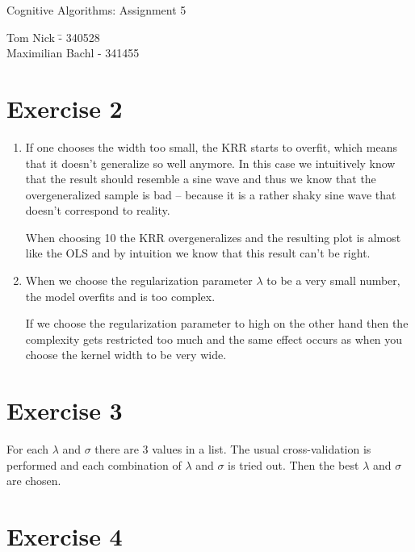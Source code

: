 \documentclass[a4paper,10pt]{article}
\begin{document}
\begin{center}
\Large{Cognitive Algorithms: Assignment 5} \\
\end{center}
\begin{tabbing}
Tom Nick \hspace{2cm}\= - 340528\\
Maximilian Bachl \> - 341455 \\
\end{tabbing}

\section*{Exercise 2}

\begin{enumerate}

\item
If one chooses the width too small, the KRR starts to overfit, which means that it doesn't generalize so well anymore. In this case we intuitively know that the result should resemble a sine wave and thus we know that the overgeneralized sample is bad -- because it is a rather shaky sine wave that doesn't correspond to reality.

When choosing 10 the KRR overgeneralizes and the resulting plot is almost like the OLS and by intuition we know that this result can't be right.

\item
When we choose the regularization parameter $\lambda$ to be a very small number, the model overfits and is too complex.

If we choose the regularization parameter to high on the other hand then the complexity gets restricted too much and the same effect occurs as when you choose the kernel width to be very wide.

\end{enumerate}

\section*{Exercise 3}

For each $\lambda$ and $\sigma$ there are 3 values in a list. The usual cross-validation is performed and each combination of $\lambda$ and $\sigma$ is tried out. Then the best $\lambda$ and $\sigma$ are chosen. 

\section*{Exercise 4}
\end{document}
